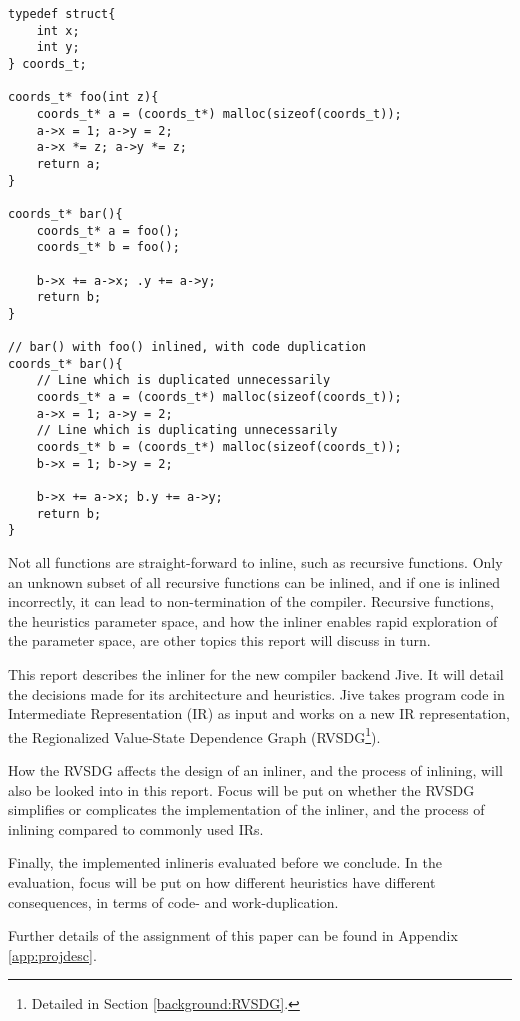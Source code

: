 \begin{lstlisting}[label={lst:code-dup}, style=customcpp,
caption={Code duplication in \textit{bar()}, when inlining \textit{foo()} into
\textit{bar()}.}]
typedef struct{
	int x;
	int y;
} coords_t;

coords_t* foo(int z){
	coords_t* a = (coords_t*) malloc(sizeof(coords_t));
	a->x = 1; a->y = 2;
	a->x *= z; a->y *= z;
	return a;
}

coords_t* bar(){
	coords_t* a = foo();
	coords_t* b = foo();

	b->x += a->x; .y += a->y;
	return b;
}

// bar() with foo() inlined, with code duplication
coords_t* bar(){
	// Line which is duplicated unnecessarily
	coords_t* a = (coords_t*) malloc(sizeof(coords_t));
	a->x = 1; a->y = 2;
	// Line which is duplicating unnecessarily
	coords_t* b = (coords_t*) malloc(sizeof(coords_t));
	b->x = 1; b->y = 2;

	b->x += a->x; b.y += a->y;
	return b;
}
\end{lstlisting}

Not all functions are straight-forward to inline, such as recursive functions.
Only an unknown subset of all recursive functions can be inlined, and if one is
inlined incorrectly, it can lead to non-termination of the compiler. Recursive
functions, the heuristics parameter space, and how the inliner enables rapid
exploration of the parameter space, are other topics this report will discuss in
turn.

This report describes the inliner for the new compiler backend Jive. It will
detail the decisions made for its architecture and heuristics. Jive takes
program code in Intermediate Representation (IR) as input and works on a new IR
representation, the Regionalized Value-State Dependence Graph
(RVSDG\footnote{Detailed in Section \ref{background:RVSDG}.}).


How the RVSDG affects the design of an inliner, and the process of inlining,
will also be looked into in this report. Focus will be put on whether the RVSDG
simplifies or complicates the implementation of the inliner, and the process of
inlining compared to commonly used IRs.

Finally, the implemented inlineris evaluated before we conclude. In the
evaluation, focus will be put on how different heuristics have different
consequences, in terms of code- and work-duplication.

Further details of the assignment of this paper can be found in Appendix
\ref{app:projdesc}.
